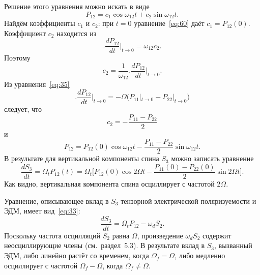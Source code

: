 \documentclass[11pt,a4paper]{article}
\begin{document}
Решение этого уравнения можно искать в виде
\begin{equation}
P_{12}=c_1\cos\omega_{12}t+c_2\sin\omega_{12}t.
\label{eq:60}
\end{equation}
Найдём коэффициенты $c_1$ и $c_2$: при $t=0$ уравнение~\eqref{eq:60}
даёт $c_1=P_{12}(0)$. Коэффициент $c_2$ находится из
\begin{equation}
\Biggl.\frac{dP_{12}}{dt}\Biggr|_{t\to 0}=\omega_{12}c_2.
\label{eq:61}
\end{equation}
Поэтому
\begin{equation}
c_2=\frac{1}{\omega_{12}}\Biggl.\frac{dP_{12}}{dt}\Biggr|_{t\to 0}.
\label{eq:62}
\end{equation}
Из уравнения~\eqref{eq:35}
\begin{equation}
\Biggl.\frac{dP_{12}}{dt}\Biggr|_{t\to 0}
=-\Omega\bigl(P_{11}|_{t\to 0}-P_{22}|_{t\to 0}\bigr)
\label{eq:63}
\end{equation}
следует, что
\begin{equation}
c_2=-\frac{P_{11}-P_{22}}{2}
\label{eq:64}
\end{equation}
и
\begin{equation}
P_{12}=P_{12}(0)\cos\omega_{12}t-\frac{P_{11}-P_{22}}{2}\sin\omega_{12}t.
\label{eq:65}
\end{equation}
В результате для вертикальной компоненты спина $S_3$ можно записать
уравнение
\begin{equation}
\frac{dS_3}{dt}
=\Omega_t P_{12}(t)
=\Omega_t\Biggl[
P_{12}(0)\cos 2\Omega t
-\frac{P_{11}(0)-P_{22}(0)}{2}\sin 2\Omega t
\Biggr].
\label{eq:66}
\end{equation}
Как видно, вертикальная компонента спина осциллирует с частотой $2\Omega$.

Уравнение, описывающее вклад в $S_3$ тензорной электрической поляризуемости
и ЭДМ, имеет вид~\eqref{eq:33}:
\begin{equation}
\frac{dS_3}{dt}=\Omega_t P_{12}-\omega_d S_2.
\label{eq:67}
\end{equation}
Поскольку частота осцилляций $S_2$ равна $\Omega$, произведение
$\omega_d S_2$ содержит неосциллирующие члены (см.\ раздел~5.3).
В результате вклад в $S_3$, вызванный ЭДМ, либо линейно растёт со временем,
когда $\Omega_f=\Omega$, либо медленно осциллирует с частотой
$\Omega_f-\Omega$, когда $\Omega_f\ne\Omega$.
\end{document}
